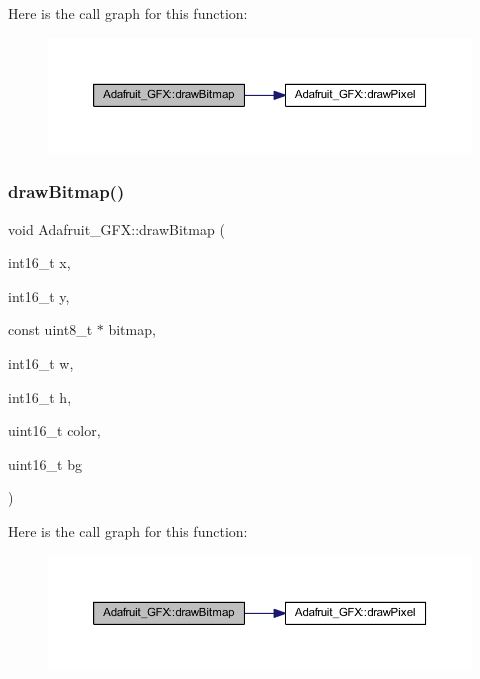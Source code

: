 Here is the call graph for this function\+:\nopagebreak
\begin{figure}[H]
\begin{center}
\leavevmode
\includegraphics[width=350pt]{class_adafruit___g_f_x_a50bf54503493152eeefa36f9768acec2_cgraph}
\end{center}
\end{figure}
\mbox{\label{class_adafruit___g_f_x_a5225478b3f2afefcb16ed03e9fe93dc0}} 
\subsubsection{\texorpdfstring{draw\+Bitmap()}{drawBitmap()}\hspace{0.1cm}{\footnotesize\ttfamily [2/2]}}
{\footnotesize\ttfamily void Adafruit\+\_\+\+G\+F\+X\+::draw\+Bitmap (\begin{DoxyParamCaption}\item[{int16\+\_\+t}]{x,  }\item[{int16\+\_\+t}]{y,  }\item[{const uint8\+\_\+t $\ast$}]{bitmap,  }\item[{int16\+\_\+t}]{w,  }\item[{int16\+\_\+t}]{h,  }\item[{uint16\+\_\+t}]{color,  }\item[{uint16\+\_\+t}]{bg }\end{DoxyParamCaption})}

Here is the call graph for this function\+:\nopagebreak
\begin{figure}[H]
\begin{center}
\leavevmode
\includegraphics[width=350pt]{class_adafruit___g_f_x_a5225478b3f2afefcb16ed03e9fe93dc0_cgraph}
\end{center}
\end{figure}
\mbox{\label{class_adafruit___g_f_x_ab7f5a29b3a3dffe30c6a3f4c1f604a5a}} 
